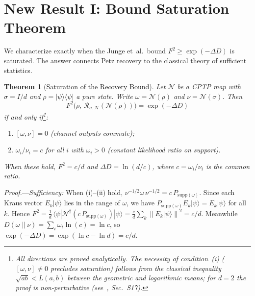 \documentclass[prl,twocolumn,superscriptaddress,longbibliography,floatfix]{revtex4-2}
\newtheorem{theorem}{Theorem}
\newcommand{\Petz}{\mathcal{R}}
\newcommand{\chan}{\mathcal{N}}
\newcommand{\ket}[1]{|#1\rangle}
\newcommand{\bra}[1]{\langle#1|}
\newcommand{\norm}[1]{\left\|#1\right\|}
\begin{document}
\section{New Result I: Bound Saturation Theorem}
\label{sec:saturation}

We characterize exactly when the Junge et~al.\ bound
$F^2 \geq \exp(-\Delta D)$ is saturated.  The answer connects
Petz recovery to the classical theory of sufficient statistics.

\begin{theorem}[Saturation of the Recovery Bound]
\label{thm:saturation}
Let\/ $\chan$ be a CPTP map with $\sigma = I/d$ and
$\rho = \ket{\psi}\!\bra{\psi}$ a pure state.  Write
$\omega = \chan(\rho)$ and $\nu = \chan(\sigma)$.  Then
\begin{equation}
F^2\!\big(\rho,\,\Petz_{\sigma,\chan}(\chan(\rho))\big)
= \exp(-\Delta D)
\label{eq:saturation}
\end{equation}
if and only if\footnote{All directions are proved analytically.
The necessity of condition~(i) ($[\omega,\nu]\neq 0$ precludes
saturation) follows from the classical inequality
$\sqrt{ab} < L(a,b)$ between the geometric and logarithmic means;
for $d = 2$ the proof is non-perturbative
(see~\cite{SM}, Sec.~S17).}:
\begin{enumerate}
\item[\emph{(i)}] $[\omega, \nu] = 0$
  \emph{(channel outputs commute);}
\item[\emph{(ii)}] $\omega_i/\nu_i = c$ for all $i$ with
  $\omega_i > 0$
  \emph{(constant likelihood ratio on support).}
\end{enumerate}
When these hold, $F^2 = c/d$ and $\Delta D = \ln(d/c)$,
where $c = \omega_i/\nu_i$ is the common ratio.
\end{theorem}

\emph{Proof.}---\emph{Sufficiency:}
When (i)--(ii) hold, $\nu^{-1/2}\omega\,\nu^{-1/2}
= c\,P_{\mathrm{supp}(\omega)}$.
Since each Kraus vector $E_k\ket{\psi}$ lies in the range of
$\omega$, we have $P_{\mathrm{supp}(\omega)}E_k\ket{\psi}
= E_k\ket{\psi}$ for all $k$.  Hence
$F^2 = \tfrac{1}{d}\,\bra{\psi}\chan^\dagger(c\,
P_{\mathrm{supp}(\omega)})\ket{\psi}
= \tfrac{c}{d}\sum_k\!\norm{E_k\ket{\psi}}^2 = c/d$.
Meanwhile $D(\omega\|\nu) = \sum_i \omega_i\ln(c) = \ln c$,
so $\exp(-\Delta D) = \exp(\ln c - \ln d) = c/d$.
\end{document}

